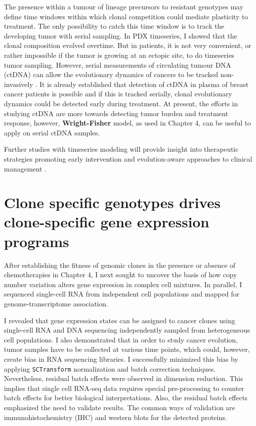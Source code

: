 The presence within a tumour of lineage precursors to resistant genotypes may define time windows within which clonal competition could mediate plasticity to treatment. The only possibility to catch this time window is to track the developing tumor with serial sampling. In PDX timeseries, I showed that the clonal composition evolved overtime. But in patients, it is not very convenient, or rather impossible if the tumor is growing at an ectopic site, to do timeseries tumor sampling. However, serial measurements of circulating tumour DNA (ctDNA) can allow the evolutionary dynamics of cancers to be tracked non-invasively . It is already established that detection of ctDNA in plasma of breast cancer patients is possible \cite{beaver2014detection, garcia2015mutation, merker2018circulating} and if this is tracked serially, clonal evolutionary dynamics could be detected early during treatment. 
At present, the efforts in studying ctDNA are more towards detecting tumor burden and treatment response, however, \textbf{Wright-Fisher} model, as used in  Chapter 4, can be useful to apply on serial ctDNA samples.

 Further studies with timeseries modeling will provide insight into therapeutic strategies promoting early intervention and evolution-aware approaches to clinical management \cite{Acar2020-tf}.
 

\section{Clone specific genotypes drives clone-specific gene expression programs}

After establishing the fitness of genomic clones in the presence or absence of chemotherapies in Chapter 4, I next sought to uncover the basis of how copy number variation alters gene expression in complex cell mixtures. In parallel, I sequenced single-cell RNA from independent cell populations and mapped for genome-transcriptome association. 

I revealed that gene expression states can be assigned to cancer clones using single-cell RNA and DNA sequencing independently sampled from heterogeneous cell populations. 
I also demonstrated that in order to study cancer evolution, tumor samples have to be collected at various time points, which could, however, create bias in RNA sequencing libraries. I successfully minimized this bias by applying \texttt{SCTransform} normalization and batch correction techniques. Nevertheless, residual batch effects were observed in dimension reduction. This implies that single cell RNA-seq data requires special pre-processing to counter batch effects for better biological interpretations. Also, the residual batch effects emphasized the need to validate results. The common ways of validation are immunohistochemistry (IHC) and western blots for the detected proteins. 

